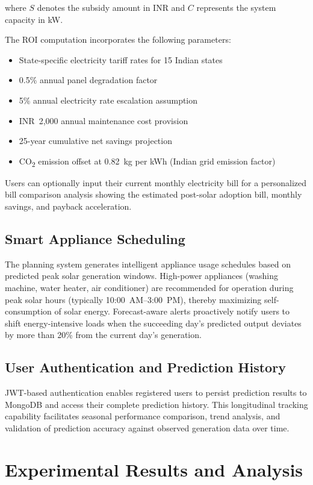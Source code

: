 \documentclass[conference]{IEEEtran}
\begin{document}
where $S$ denotes the subsidy amount in INR and $C$ represents the system capacity in kW.

The ROI computation incorporates the following parameters:
\begin{itemize}
\item State-specific electricity tariff rates for 15 Indian states
\item 0.5\% annual panel degradation factor
\item 5\% annual electricity rate escalation assumption
\item INR~2,000 annual maintenance cost provision
\item 25-year cumulative net savings projection
\item CO\textsubscript{2} emission offset at 0.82~kg per kWh (Indian grid emission factor)
\end{itemize}

Users can optionally input their current monthly electricity bill for a personalized bill comparison analysis showing the estimated post-solar adoption bill, monthly savings, and payback acceleration.

\subsection{Smart Appliance Scheduling}

The planning system generates intelligent appliance usage schedules based on predicted peak solar generation windows. High-power appliances (washing machine, water heater, air conditioner) are recommended for operation during peak solar hours (typically 10:00~AM--3:00~PM), thereby maximizing self-consumption of solar energy. Forecast-aware alerts proactively notify users to shift energy-intensive loads when the succeeding day's predicted output deviates by more than 20\% from the current day's generation.

\subsection{User Authentication and Prediction History}

JWT-based authentication enables registered users to persist prediction results to MongoDB and access their complete prediction history. This longitudinal tracking capability facilitates seasonal performance comparison, trend analysis, and validation of prediction accuracy against observed generation data over time.

\section{Experimental Results and Analysis}
\end{document}
